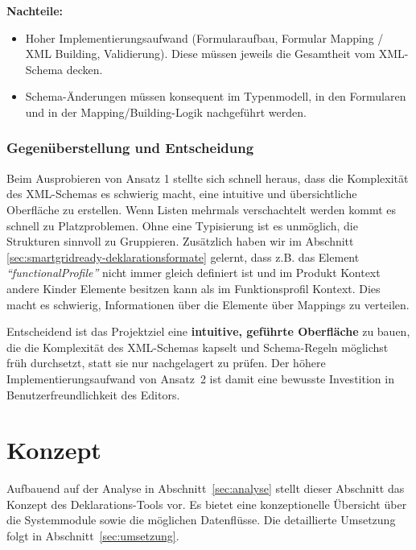 \documentclass[a4paper,12pt]{article}
\newcommand{\xmlelement}[1]{\textit{``#1''}}
\begin{document}
\noindent\textbf{Nachteile:}
\begin{itemize}
    \item Hoher Implementierungsaufwand (Formularaufbau, Formular Mapping / XML Building, Validierung). Diese 
    müssen jeweils die Gesamtheit vom XML-Schema decken.
    \item Schema-Änderungen müssen konsequent im Typenmodell, in den Formularen und in der Mapping/Building-Logik 
    nachgeführt werden.
\end{itemize}

\subsubsection{Gegenüberstellung und Entscheidung}

Beim Ausprobieren von Ansatz 1 stellte sich schnell heraus, dass die Komplexität des XML-Schemas es schwierig 
macht, eine intuitive und übersichtliche Oberfläche zu erstellen. Wenn Listen mehrmals verschachtelt werden kommt 
es schnell zu Platzproblemen. Ohne eine Typisierung ist es unmöglich, die Strukturen sinnvoll zu Gruppieren. 
Zusätzlich haben wir im Abschnitt \ref{sec:smartgridready-deklarationsformate} gelernt, dass z.B. das Element 
\xmlelement{functionalProfile} nicht immer gleich definiert ist und im Produkt Kontext andere Kinder Elemente 
besitzen kann als im Funktionsprofil Kontext. Dies macht es schwierig, Informationen über die Elemente über 
Mappings zu verteilen. \newline

\noindent Entscheidend ist das Projektziel eine \textbf{intuitive, geführte Oberfläche} zu bauen, die die Komplexität des 
XML-Schemas kapselt und Schema-Regeln möglichst früh durchsetzt, statt sie nur nachgelagert zu prüfen.
Der höhere Implementierungsaufwand von Ansatz~2 ist damit eine bewusste Investition in Benutzerfreundlichkeit 
des Editors.

\newpage

\section{Konzept}
\label{sec:konzept}

Aufbauend auf der Analyse in Abschnitt~\ref{sec:analyse} stellt dieser Abschnitt das Konzept des Deklarations-Tools vor.
Es bietet eine konzeptionelle Übersicht über die Systemmodule sowie die möglichen Datenflüsse.
Die detaillierte Umsetzung folgt in Abschnitt~\ref{sec:umsetzung}.
\end{document}

